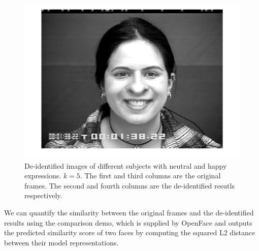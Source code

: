 \begin{figure}[!htb]
    	\includegraphics[scale=.10]{figure/72de/14.png}

		\caption{ De-identified images of different subjects with neutral and happy expressions. $k=5$. The 
		first and third columns are the original frames. The second and fourth columns are the 
		de-identified resutls respectively. }
		\label{fig:results_2}
  	\end{figure}




We can quantify the similarity between the original frames and the de-identified results using the comparison 
demo, which is supplied by OpenFace \cite{facenet15,openface16} and outputs the predicted similarity score of two faces by 
computing the squared L2 distance between their model representations.


